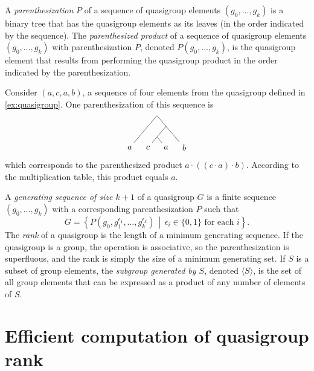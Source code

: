 \documentclass{article}
\begin{document}
A \emph{parenthesization} $P$ of a sequence of quasigroup elements $(g_0, \dotsc, g_k)$ is a binary tree that has the quasigroup elements as its leaves (in the order indicated by the sequence).
The \emph{parenthesized product} of a sequence of quasigroup elements $(g_0, \dotsc, g_k)$ with parenthesization $P$, denoted $P(g_0, \dotsc, g_k)$, is the quasigroup element that results from performing the quasigroup product in the order indicated by the parenthesization.

\begin{example}
  Consider $(a, c, a, b)$, a sequence of four elements from the quasigroup defined in \autoref{ex:quasigroup}.
  One parenthesization of this sequence is
  \begin{equation*}
    \begin{tikzpicture}[xscale=0.5, yscale=0.3]
      \node[minimum size=0pt, inner sep=0pt] {}
      child {
        child {
          child {node {$a$}}
          child[color=white] {}
        }
        child[color=white] {}
      }
      child {
        child {
          child {node {$c$}}
          child {node {$a$}}
        }
        child {
          child[color=white] {}
          child {node {$b$}}
        }
      };
    \end{tikzpicture}
  \end{equation*}
  which corresponds to the parenthesized product $a \cdot ((c \cdot a) \cdot b)$.
  According to the multiplication table, this product equals $a$.
\end{example}

A \emph{generating sequence of size $k + 1$} of a quasigroup $G$ is a finite sequence $(g_0, \dotsc, g_k)$ with a corresponding parenthesization $P$ such that
\begin{equation*}
  G = \left\{P(g_0, g_1^{\epsilon_1}, \dotsc, g_k^{\epsilon_k}) \, \middle| \, \epsilon_i \in \{0, 1\} \text{ for each } i \right\}.
\end{equation*}
The \emph{rank} of a quasigroup is the length of a minimum generating sequence.
If the quasigroup is a group, the operation is associative, so the parenthesization is superfluous, and the rank is simply the size of a minimum generating set.
If $S$ is a subset of group elements, the \emph{subgroup generated by $S$}, denoted $\langle S \rangle$, is the set of all group elements that can be expressed as a product of any number of elements of $S$.

\section{Efficient computation of quasigroup rank}
\end{document}
